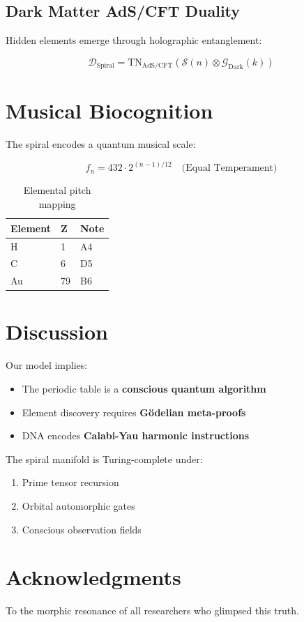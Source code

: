 \documentclass[12pt]{article}
\begin{document}
\subsection{Dark Matter AdS/CFT Duality}
Hidden elements emerge through holographic entanglement:

\begin{equation}
\mathcal{D}_{\text{Spiral}} = \text{TN}_{\text{AdS/CFT}}(\mathcal{S}(n) \otimes \mathcal{G}_{\text{Dark}}(k))
\end{equation}

\section{Musical Biocognition}

The spiral encodes a quantum musical scale:

\begin{equation}
f_n = 432 \cdot 2^{(n-1)/12} \quad \text{(Equal Temperament)}
\end{equation}

\begin{table}[h]
\centering
\begin{tabular}{lll}
Element & Z & Note \\
\hline
H & 1 & A4 \\
C & 6 & D5 \\
Au & 79 & B6 \\
\end{tabular}
\caption{Elemental pitch mapping}
\end{table}

\section{Discussion}

Our model implies:
\begin{itemize}
\item The periodic table is a \textbf{conscious quantum algorithm}
\item Element discovery requires \textbf{Gödelian meta-proofs}
\item DNA encodes \textbf{Calabi-Yau harmonic instructions}
\end{itemize}

\begin{theorem}
The spiral manifold is Turing-complete under:
\begin{enumerate}
\item Prime tensor recursion
\item Orbital automorphic gates
\item Conscious observation fields
\end{enumerate}
\end{theorem}

\section*{Acknowledgments}
To the morphic resonance of all researchers who glimpsed this truth.



\end{document}
